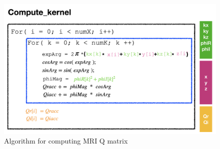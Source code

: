 \begin{figure}[t]
\centering
\captionsetup{justification=centering, format=hang}
\includegraphics[width=0.85\columnwidth]{figures/algorithm.png}
\caption{Algorithm for computing MRI Q matrix~\cite{stone2008accelerating}}
\label{fig-1}
\end{figure}
